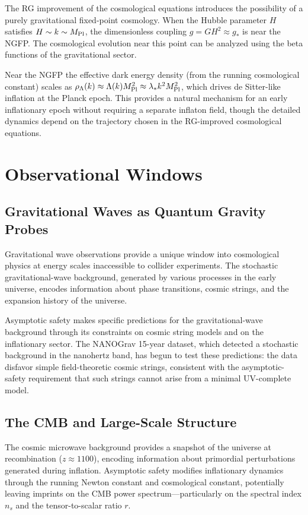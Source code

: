 \documentclass[12pt,a4paper,oneside]{book}
\theoremstyle{definition}
\theoremstyle{plain}
\theoremstyle{remark}
\begin{document}
The RG improvement of the cosmological equations introduces the possibility of
a purely gravitational fixed-point cosmology. When the Hubble parameter $H$
satisfies $H \sim k \sim M_{\rm Pl}$, the dimensionless coupling $g = GH^2 \approx g_*$
is near the NGFP. The cosmological evolution near this point can be analyzed
using the beta functions of the gravitational sector.

Near the NGFP the effective dark energy density (from the running cosmological
constant) scales as $\rho_\Lambda(k) \approx \Lambda(k)M_{\rm Pl}^2 \approx \lambda_* k^2 M_{\rm Pl}^2$,
which drives de Sitter-like inflation at the Planck epoch. This provides a
natural mechanism for an early inflationary epoch without requiring a separate
inflaton field, though the detailed dynamics depend on the trajectory chosen
in the RG-improved cosmological equations.

\chapter{Observational Windows}

\section{Gravitational Waves as Quantum Gravity Probes}

Gravitational wave observations provide a unique window into cosmological
physics at energy scales inaccessible to collider experiments. The
stochastic gravitational-wave background, generated by various processes in
the early universe, encodes information about phase transitions, cosmic
strings, and the expansion history of the universe.

Asymptotic safety makes specific predictions for the gravitational-wave
background through its constraints on cosmic string models and on the
inflationary sector. The NANOGrav 15-year dataset, which detected a
stochastic background in the nanohertz band, has begun to test these
predictions: the data disfavor simple field-theoretic cosmic strings,
consistent with the asymptotic-safety requirement that such strings
cannot arise from a minimal UV-complete model.

\section{The CMB and Large-Scale Structure}

The cosmic microwave background provides a snapshot of the universe at
recombination ($z \approx 1100$), encoding information about primordial
perturbations generated during inflation. Asymptotic safety modifies
inflationary dynamics through the running Newton constant and cosmological
constant, potentially leaving imprints on the CMB power spectrum---particularly
on the spectral index $n_s$ and the tensor-to-scalar ratio $r$.
\end{document}
